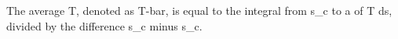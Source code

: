 The average T, denoted as T-bar, is equal to the integral from s_c to a of T ds, divided by the difference s_c minus s_c.